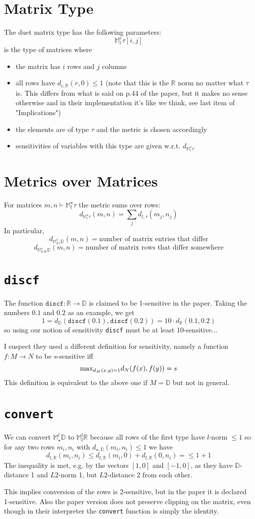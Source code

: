 \documentclass{article}
\begin{document}
\section*{Matrix Type}
The duet matrix type has the following parameters:
$$\mathbb{M}^c_l \tau[i,j]$$
is the type of matrices where
\begin{itemize}
   \item the matrix has $i$ rows and $j$ columns
   \item all rows have $d_{c,\mathbb{R}}(r,0) \leq 1$ (note that this is the $\mathbb{R}$ norm no matter what $\tau$ is. This differs from what is said on p.44 of the paper, but it makes no sense otherwise and in their implementation it's like we think, see last item of "Implications")
   \item the elements are of type $\tau$ and the metric is chosen accordingly
   \item sensitivities of variables with this type are given w.r.t. $d_{\mathbb{M}^\star_l\tau}$
\end{itemize}

\section*{Metrics over Matrices}
For matrices $m,n \vdash \mathbb{M}^\star_l\tau$ the metric sums over rows:
      $$d_{\mathbb{M}^\star_l\tau}(m,n) = \sum_j d_{l,\tau}(m_j,n_j)$$
In particular,
$$d_{\mathbb{M}^\star_{L1}\mathbb{D}}(m,n) = \text{number of matrix entries that differ}$$
$$d_{\mathbb{M}^\star_{L\infty}\mathbb{D}}(m,n) = \text{number of matrix rows that differ somewhere}$$

\section*{\texttt{discf}}
The function $\texttt{discf} : \mathbb{R}\rightarrow\mathbb{D}$ is claimed to be 1-sensitive in the paper. Taking the numbers $0.1$ and $0.2$ as an example, we get
\[1 = d_{\mathbb{D}}(\texttt{discf}(0.1),\texttt{discf}(0.2)) = 10 \cdot d_{\mathbb{R}}(0.1,0.2)\]
so using our notion of sensitivity \texttt{discf} must be at least 10-sensitive...

I suspect they used a different definition for sensitivity, namely a function $f:M\rightarrow N$ to be $s$-sensitive iff
\[\textnormal{max}_{d_M(x,y)=1} d_N(f(x),f(y)) = s\]
This definition is equivalent to the above one if $M = \mathbb{D}$ but not in general.

\section*{\texttt{convert}}
We can convert $\mathbb{M}^l_\star\mathbb{D}$ to $ \mathbb{M}^l_l\mathbb{R}$ because all rows of the first type have $l$-norm $\leq 1$ so for any two rows $m_i,n_i$ with $d_{\star,\mathbb{D}}(m_i,n_i) \leq 1$ we have 
      $$d_{l,\mathbb{R}}(m_i,n_i) \leq d_{l,\mathbb{R}}(m_i,0) + d_{l,\mathbb{R}}(0,n_i)  = \leq 1 + 1$$
The inequality is met, e.g. by the vectors $[1,0]$ and $[-1,0]$, as they have $\mathbb{D}$-distance 1 and $L2$-norm 1, but $L2$-distance 2 from each other.

This implies conversion of the rows is 2-sensitive, but in the paper it is declared 1-sensitive. Also the paper version does not preserve clipping on the matrix, even though in their interpreter the \texttt{convert} function is simply the identity.
\end{document}
